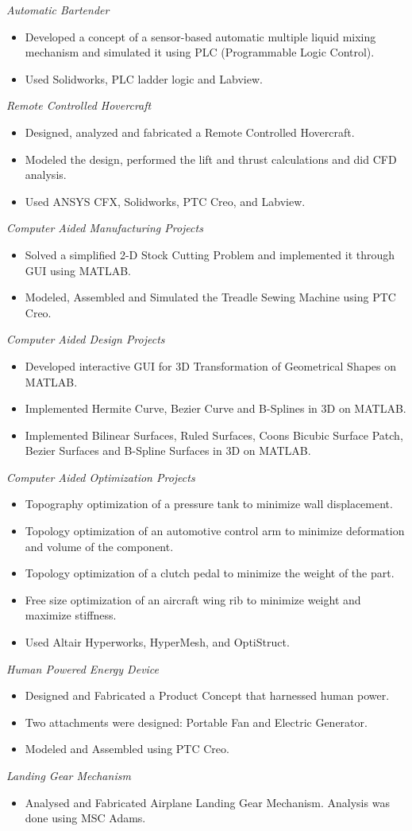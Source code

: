 \documentclass[letterpaper,10pt]{article}
\newcommand{\resumeSubheading}[1]{
	\vspace{-3pt}
      {\small\textit{#1}} \\
      \vspace{-3pt}
}
\newcommand{\resumeItemListStart}{
\vspace{-7pt}
\begin{itemize}[leftmargin=14pt]
}
\newcommand{\resumeItemListEnd}{
\vspace{+7pt}
\end{itemize}
}
\newcommand{\resumeItem}[1]{
  \item\small{
      {#1 \vspace{-7pt}
      }
  }
}
\begin{document}
\resumeSubheading{Automatic Bartender}
\resumeItemListStart
\resumeItem{Developed a concept of a sensor-based automatic multiple liquid mixing mechanism and simulated it using PLC (Programmable Logic Control).}
\resumeItem{Used Solidworks, PLC ladder logic and Labview.}
\resumeItemListEnd

\resumeSubheading{Remote Controlled Hovercraft}
\resumeItemListStart
\resumeItem{Designed, analyzed and fabricated a Remote Controlled Hovercraft.}
\resumeItem{Modeled the design, performed the lift and thrust calculations and did CFD analysis.}
\resumeItem{Used ANSYS CFX, Solidworks, PTC Creo, and Labview.}
\resumeItemListEnd

\resumeSubheading{Computer Aided Manufacturing Projects}
\resumeItemListStart
\resumeItem{Solved a simplified 2-D Stock Cutting Problem and implemented it through GUI using MATLAB.}
\resumeItem{Modeled, Assembled and Simulated the Treadle Sewing Machine using PTC Creo.}
\resumeItemListEnd

\resumeSubheading{Computer Aided Design Projects}
\resumeItemListStart
\resumeItem{Developed interactive GUI for 3D Transformation of Geometrical Shapes on MATLAB.}
\resumeItem{Implemented Hermite Curve, Bezier Curve and B-Splines in 3D on MATLAB.}
\resumeItem{Implemented Bilinear Surfaces, Ruled Surfaces, Coons Bicubic Surface Patch, Bezier Surfaces and B-Spline Surfaces in 3D on MATLAB.}
\resumeItemListEnd

\resumeSubheading{Computer Aided Optimization Projects}
\resumeItemListStart
\resumeItem{Topography optimization of a pressure tank to minimize wall displacement.}
\resumeItem{Topology optimization of an automotive control arm to minimize deformation and volume of the component.}
\resumeItem{Topology optimization of a clutch pedal to minimize the weight of the part.}
\resumeItem{Free size optimization of an aircraft wing rib to minimize weight and maximize stiffness.}
\resumeItem{Used Altair Hyperworks, HyperMesh, and OptiStruct.}
\resumeItemListEnd

\resumeSubheading{Human Powered Energy Device}
\resumeItemListStart
\resumeItem{Designed and Fabricated a Product Concept that harnessed human power.}
\resumeItem{Two attachments were designed: Portable Fan and Electric Generator.}
\resumeItem{Modeled and Assembled using PTC Creo.}
\resumeItemListEnd

\resumeSubheading{Landing Gear Mechanism}
\resumeItemListStart
\resumeItem{Analysed and Fabricated Airplane Landing Gear Mechanism. Analysis was done using MSC Adams.}
\resumeItemListEnd
\end{document}
